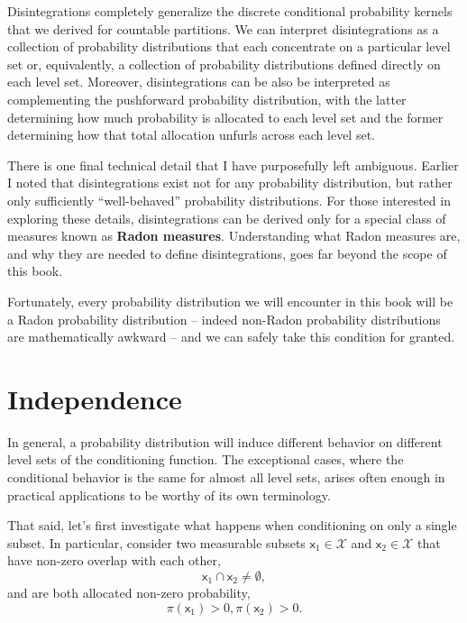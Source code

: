 \documentclass[
  letterpaper,
  DIV=11,
  numbers=noendperiod]{scrartcl}
\begin{document}
Disintegrations completely generalize the discrete conditional
probability kernels that we derived for countable partitions. We can
interpret disintegrations as a collection of probability distributions
that each concentrate on a particular level set or, equivalently, a
collection of probability distributions defined directly on each level
set. Moreover, disintegrations can be also be interpreted as
complementing the pushforward probability distribution, with the latter
determining how much probability is allocated to each level set and the
former determining how that total allocation unfurls across each level
set.

There is one final technical detail that I have purposefully left
ambiguous. Earlier I noted that disintegrations exist not for any
probability distribution, but rather only sufficiently ``well-behaved''
probability distributions. For those interested in exploring these
details, disintegrations can be derived only for a special class of
measures known as \textbf{Radon measures}. Understanding what Radon
measures are, and why they are needed to define disintegrations, goes
far beyond the scope of this book.

Fortunately, every probability distribution we will encounter in this
book will be a Radon probability distribution -- indeed non-Radon
probability distributions are mathematically awkward -- and we can
safely take this condition for granted.

\section{Independence}\label{sec:independence}

In general, a probability distribution will induce different behavior on
different level sets of the conditioning function. The exceptional
cases, where the conditional behavior is the same for almost all level
sets, arises often enough in practical applications to be worthy of its
own terminology.

That said, let's first investigate what happens when conditioning on
only a single subset. In particular, consider two measurable subsets
\(\mathsf{x}_{1} \in \mathcal{X}\) and
\(\mathsf{x}_{2} \in \mathcal{X}\) that have non-zero overlap with each
other, \[
\mathsf{x}_{1} \cap \mathsf{x}_{2} \ne \emptyset,
\] and are both allocated non-zero probability, \[
\pi(\mathsf{x}_{1}) > 0, \pi(\mathsf{x}_{2}) > 0.
\]
\end{document}
